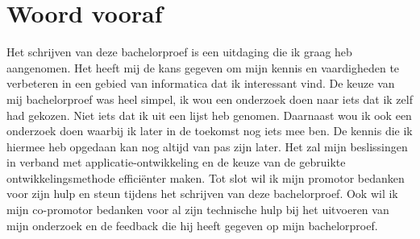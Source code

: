 
\chapter{Woord vooraf}
\label{ch:voorwoord}


Het schrijven van deze bachelorproef is een uitdaging die ik graag heb aangenomen. 
Het heeft mij de kans gegeven om mijn kennis en vaardigheden te verbeteren in een gebied van informatica 
dat ik interessant vind. De keuze van mij bachelorproef was heel simpel, ik wou een onderzoek doen naar 
iets dat ik zelf had gekozen. Niet iets dat ik uit een lijst heb genomen. Daarnaast wou ik ook 
een onderzoek doen waarbij ik later in de toekomst nog iets mee ben. De kennis die ik hiermee heb 
opgedaan kan nog altijd van pas zijn later. Het zal mijn beslissingen in verband met applicatie-ontwikkeling 
en de keuze van de gebruikte ontwikkelingsmethode efficiënter maken. Tot slot wil ik mijn promotor 
bedanken voor zijn hulp en steun tijdens het schrijven van deze bachelorproef. Ook wil ik mijn 
co-promotor bedanken voor al zijn technische hulp bij het uitvoeren van mijn onderzoek en de 
feedback die hij heeft gegeven op mijn bachelorproef.